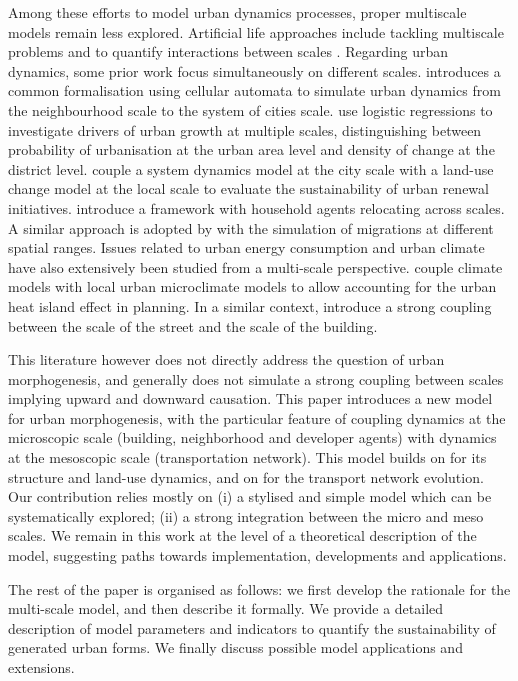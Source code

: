 \documentclass[letterpaper]{article}
\begin{document}
Among these efforts to model urban dynamics processes, proper multiscale models remain less explored. Artificial life approaches include tackling multiscale problems and to quantify interactions between scales \citep{seth2010measuring}. Regarding urban dynamics, some prior work focus simultaneously on different scales. \cite{batty2005agents} introduces a common formalisation using cellular automata to simulate urban dynamics from the neighbourhood scale to the system of cities scale. \cite{cheng2003modelling} use logistic regressions to investigate drivers of urban growth at multiple scales, distinguishing between probability of urbanisation at the urban area level and density of change at the district level. \cite{zheng2017decision} couple a system dynamics model at the city scale with a land-use change model at the local scale to evaluate the sustainability of urban renewal initiatives. \cite{torrens2012polyspatial} introduce a framework with household agents relocating across scales. A similar approach is adopted by \cite{murcio2015urban} with the simulation of migrations at different spatial ranges. Issues related to urban energy consumption and urban climate have also extensively been studied from a multi-scale perspective. \cite{lim2017multi} couple climate models with local urban microclimate models to allow accounting for the urban heat island effect in planning. In a similar context, \cite{wong2021integrated} introduce a strong coupling between the scale of the street and the scale of the building.


This literature however does not directly address the question of urban morphogenesis,  and generally does not simulate a strong coupling between scales implying upward and downward causation. This paper introduces a new model for urban morphogenesis, with the particular feature of coupling dynamics at the microscopic scale (building, neighborhood and developer agents) with dynamics at the mesoscopic scale (transportation network). This model builds on \citep{raimbault2014hybrid} for its structure and land-use dynamics, and on \citep{le2015modeling} for the transport network evolution. Our contribution relies mostly on (i) a stylised and simple model which can be systematically explored; (ii) a strong integration between the micro and meso scales. We remain in this work at the level of a theoretical description of the model, suggesting paths towards implementation, developments and applications.

The rest of the paper is organised as follows: we first develop the rationale for the multi-scale model, and then describe it formally. We provide a detailed description of model parameters and indicators to quantify the sustainability of generated urban forms. We finally discuss possible model applications and extensions.
\end{document}
